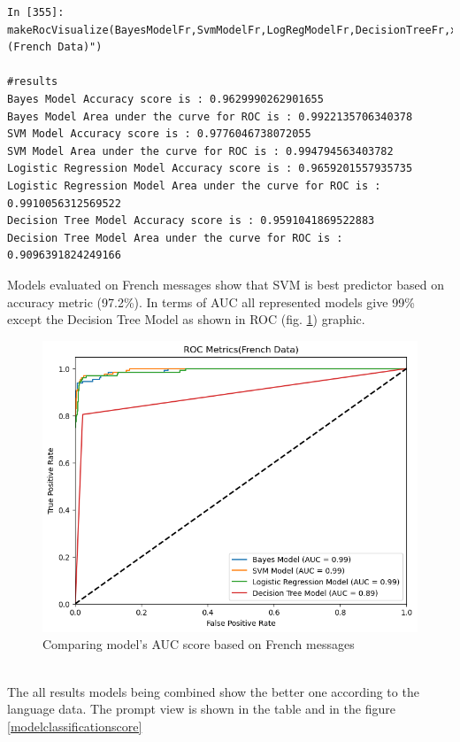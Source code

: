\documentclass[12pt,a4paper, oneside]{book}
\begin{document}
 \begin{lstlisting}[style=stylejupyter]
In [355]: makeRocVisualize(BayesModelFr,SvmModelFr,LogRegModelFr,DecisionTreeFr,x_test_features_fr,y_test_fr,"(French Data)")

#results 
Bayes Model Accuracy score is : 0.9629990262901655
Bayes Model Area under the curve for ROC is : 0.9922135706340378
SVM Model Accuracy score is : 0.9776046738072055
SVM Model Area under the curve for ROC is : 0.994794563403782
Logistic Regression Model Accuracy score is : 0.9659201557935735
Logistic Regression Model Area under the curve for ROC is : 0.9910056312569522
Decision Tree Model Accuracy score is : 0.9591041869522883
Decision Tree Model Area under the curve for ROC is : 0.9096391824249166
\end{lstlisting}  
Models evaluated on French messages show that SVM is best predictor based on accuracy metric (97.2\%). In terms of AUC all represented models give 99\% except the Decision Tree Model as shown in ROC (fig. \ref{fig:rocfrench}) graphic. 
\\
\begin{figure}
	\centering
	\includegraphics[width=0.9\linewidth]{CollectImages/rocFrench}
	\caption{Comparing model's AUC score based on French messages}
	\label{fig:rocfrench}
\end{figure}
\\
The all results models being combined show the better one according to the language data. The prompt view is shown in the table and in the figure \ref{modelclassificationscore}
\end{document}
